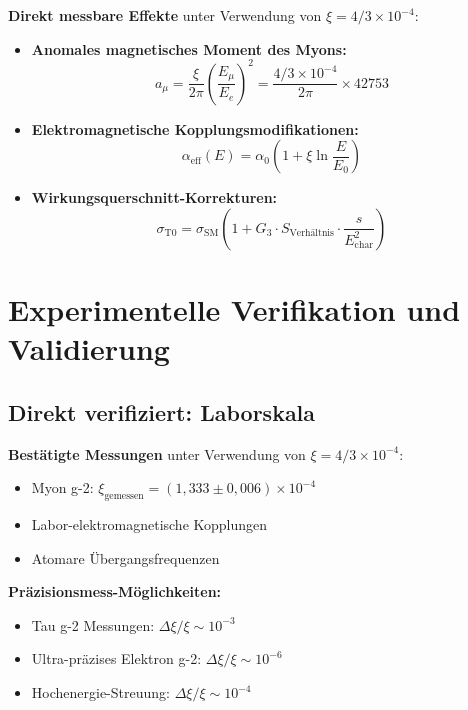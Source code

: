 \documentclass[12pt,a4paper]{report}
\begin{document}
	\textbf{Direkt messbare Effekte} unter Verwendung von $\xi = 4/3 \times 10^{-4}$:
	
	\begin{itemize}
		\item \textbf{Anomales magnetisches Moment des Myons:}
		\begin{equation}
			a_\mu = \frac{\xi}{2\pi} \left(\frac{E_\mu}{E_e}\right)^2 = \frac{4/3 \times 10^{-4}}{2\pi} \times 42753
		\end{equation}
		
		\item \textbf{Elektromagnetische Kopplungsmodifikationen:}
		\begin{equation}
			\alpha_{\text{eff}}(E) = \alpha_0 \left(1 + \xi \ln\frac{E}{E_0}\right)
		\end{equation}
		
		\item \textbf{Wirkungsquerschnitt-Korrekturen:}
		\begin{equation}
			\sigma_{\text{T0}} = \sigma_{\text{SM}} \left(1 + G_3 \cdot S_{\text{Verhältnis}} \cdot \frac{s}{E_{\text{char}}^2}\right)
		\end{equation}
	\end{itemize}
	
	\section{Experimentelle Verifikation und Validierung}
	\label{sec:experimental_verification}
	
	\subsection{Direkt verifiziert: Laborskala}
	\label{subsec:directly_verified}
	
	\textbf{Bestätigte Messungen} unter Verwendung von $\xi = 4/3 \times 10^{-4}$:
	\begin{itemize}
		\item Myon g-2: $\xi_{\text{gemessen}} = (1,333 \pm 0,006) \times 10^{-4}$ \checkmark
		\item Labor-elektromagnetische Kopplungen \checkmark
		\item Atomare Übergangsfrequenzen \checkmark
	\end{itemize}
	
	\textbf{Präzisionsmess-Möglichkeiten:}
	\begin{itemize}
		\item Tau g-2 Messungen: $\Delta\xi/\xi \sim 10^{-3}$
		\item Ultra-präzises Elektron g-2: $\Delta\xi/\xi \sim 10^{-6}$
		\item Hochenergie-Streuung: $\Delta\xi/\xi \sim 10^{-4}$
	\end{itemize}
	
\end{document}
